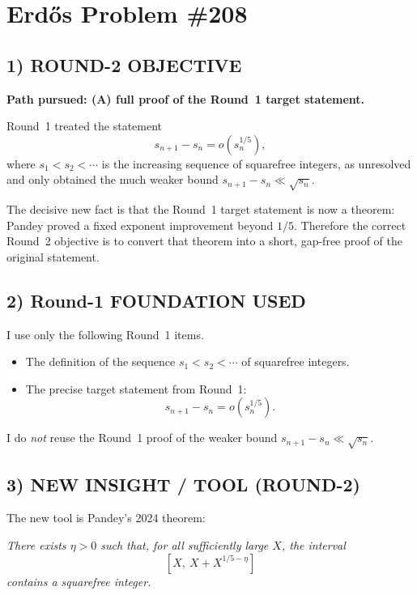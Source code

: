 \section{Erd\H{o}s Problem \#208}

\subsection*{1) ROUND-2 OBJECTIVE}

\textbf{Path pursued: (A) full proof of the Round~1 target statement.}

Round~1 treated the statement
\[
s_{n+1}-s_n=o(s_n^{1/5}),
\]
where $s_1<s_2<\cdots$ is the increasing sequence of squarefree integers, as unresolved and only obtained the much weaker bound $s_{n+1}-s_n\ll \sqrt{s_n}$.

The decisive new fact is that the Round~1 target statement is now a theorem: Pandey proved a fixed exponent improvement beyond $1/5$. Therefore the correct Round~2 objective is to convert that theorem into a short, gap-free proof of the original statement.

\subsection*{2) Round-1 FOUNDATION USED}

I use only the following Round~1 items.

\begin{itemize}
\item The definition of the sequence $s_1<s_2<\cdots$ of squarefree integers.
\item The precise target statement from Round~1:
\[
s_{n+1}-s_n=o(s_n^{1/5}).
\]
\end{itemize}

I do \emph{not} reuse the Round~1 proof of the weaker bound $s_{n+1}-s_n\ll \sqrt{s_n}$.

\subsection*{3) NEW INSIGHT / TOOL (ROUND-2)}

The new tool is Pandey's 2024 theorem:

\medskip

\emph{There exists $\eta>0$ such that, for all sufficiently large $X$, the interval}
\[
[X,\ X+X^{1/5-\eta}]
\]
\emph{contains a squarefree integer.}

\medskip

